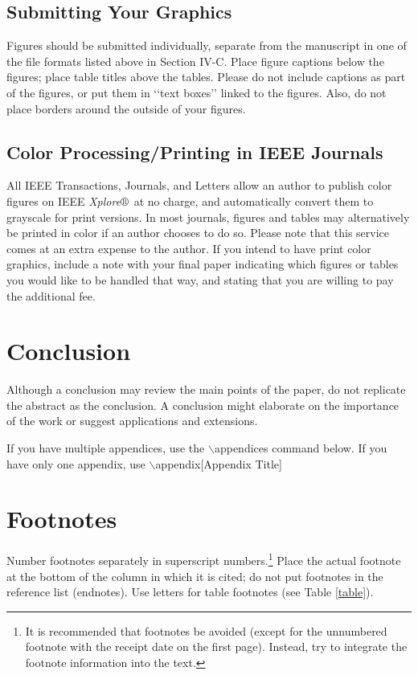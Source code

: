 \documentclass{ieeeaccess}
\begin{document}
\subsection{Submitting Your Graphics}
Figures should be submitted individually, separate from the manuscript in one of the file formats listed above in Section IV-C. Place figure captions below the figures; place table titles above the tables. Please do not include captions as part of the figures, or put them in ‘‘text boxes’’ linked to the figures. Also, do not place borders around the outside of your figures.

\subsection{Color Processing/Printing in IEEE Journals}
All IEEE Transactions, Journals, and Letters allow an author to publish
color figures on IEEE {\it Xplore}$\circledR$\ at no charge, and automatically
convert them to grayscale for print versions. In most journals, figures and
tables may alternatively be printed in color if an author chooses to do so.
Please note that this service comes at an extra expense to the author. If
you intend to have print color graphics, include a note with your final
paper indicating which figures or tables you would like to be handled that
way, and stating that you are willing to pay the additional fee.

\section{Conclusion}
Although a conclusion may review the  main points of the paper, do not replicate the abstract as the conclusion. A
conclusion might elaborate on the importance of the work or suggest
applications and extensions.

If you have multiple appendices, use the $\backslash$appendices command below. If you have only one appendix, use
$\backslash$appendix[Appendix Title]

\appendices
\section{\break Footnotes}
Number footnotes separately in superscript numbers.\footnote{It is recommended that footnotes be avoided (except for
	the unnumbered footnote with the receipt date on the first page). Instead,
	try to integrate the footnote information into the text.} Place the actual
footnote at the bottom of the column in which it is cited; do not put
footnotes in the reference list (endnotes). Use letters for table footnotes
(see Table \ref{table}).
\end{document}
